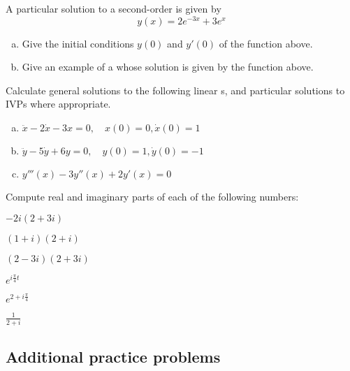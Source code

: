 \begin{question}
  A particular solution to a second-order \ode{} is given by
  \[
    y(x) = 2e^{-3x} + 3 e^{x}
  \]

  \begin{enumerate}[(a)]
  \item Give the initial conditions \(y(0)\) and \(y'(0)\) of the function above.
  \item Give an example of a \ode{} whose solution is given by the function above.
\end{enumerate}
\end{question}

\begin{question}
  Calculate general solutions to the following linear \ode{}s, and particular solutions to IVPs where appropriate.
  \begin{enumerate}[(a)]
  \item \(\ddot{x} - 2\dot{x} - 3x = 0,\quad x(0) = 0, \dot x(0) = 1\)
  \item \(\ddot{y} - 5\dot{y} + 6y = 0,\quad y(0) = 1, \dot y(0) = -1\)
  \item \(y'''(x) - 3y''(x) + 2y'(x) = 0\)
  \end{enumerate}
\end{question}

\begin{question}
  Compute real and imaginary parts of each of the following numbers:
  \begin{colenumerate}[3]
    \item \(-2i(2+3i)\)
    \item \((1+i)(2+i)\)
    \item \((2-3i)(2+3i)\)
    \item \(e^{i \frac{\pi}{4}t}\)
    \item \(e^{2+i \frac{\pi}{4}}\)
    \item \(\frac{1}{2+i}  \)
  \end{colenumerate}
\end{question}

\subsection*{Additional practice problems}


